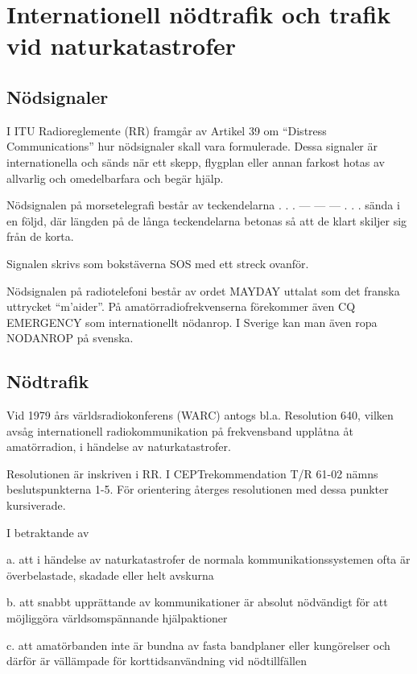 \section{Internationell nödtrafik och trafik vid naturkatastrofer}

\subsection{Nödsignaler}

I ITU Radioreglemente (RR) framgår av Artikel 39 om ``Distress Communications''
hur nödsignaler skall vara formulerade. Dessa signaler är internationella och
sänds när ett skepp, flygplan eller annan farkost hotas av allvarlig och
omedelbarfara och begär hjälp.

Nödsignalen på morsetelegrafi består av teckendelarna . . . --- --- --- . . .
sända i en följd, där längden på de långa teckendelarna betonas så att de klart
skiljer sig från de korta.

Signalen skrivs som bokstäverna SOS med ett streck ovanför.

Nödsignalen på radiotelefoni består av ordet MAYDAY uttalat som det franska
uttrycket ``m'aider''.  På amatörradiofrekvenserna förekommer även CQ EMERGENCY
som internationellt nödanrop. I Sverige kan man även ropa NODANROP på svenska.

\subsection{Nödtrafik}

Vid 1979 års världsradiokonferens (WARC) antogs bl.a. Resolution 640, vilken
avsåg internationell radiokommunikation på frekvensband upplåtna åt
amatörradion, i händelse av naturkatastrofer.

Resolutionen är inskriven i RR. I CEPTrekommendation T/R 61-02 nämns
beslutspunkterna 1-5. För orientering återges resolutionen med dessa punkter
kursiverade.

I betraktande av

a. att i händelse av naturkatastrofer de normala kommunikationssystemen ofta är
överbelastade, skadade eller helt avskurna

b. att snabbt upprättande av kommunikationer är absolut nödvändigt för att
möjliggöra världsomspännande hjälpaktioner

c. att amatörbanden inte är bundna av fasta bandplaner eller kungörelser och
därför är vällämpade för korttidsanvändning vid nödtillfällen

